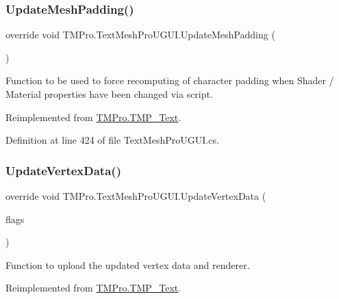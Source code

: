 \subsubsection{\texorpdfstring{UpdateMeshPadding()}{UpdateMeshPadding()}}
{\footnotesize\ttfamily override void T\+M\+Pro.\+Text\+Mesh\+Pro\+U\+G\+U\+I.\+Update\+Mesh\+Padding (\begin{DoxyParamCaption}{ }\end{DoxyParamCaption})\hspace{0.3cm}{\ttfamily [virtual]}}



Function to be used to force recomputing of character padding when Shader / Material properties have been changed via script. 



Reimplemented from \mbox{\hyperlink{class_t_m_pro_1_1_t_m_p___text_a874daa5045c407a26694d92f855c0761}{T\+M\+Pro.\+T\+M\+P\+\_\+\+Text}}.



Definition at line 424 of file Text\+Mesh\+Pro\+U\+G\+U\+I.\+cs.

\mbox{\label{class_t_m_pro_1_1_text_mesh_pro_u_g_u_i_a2fb671e18fda5d2e996ed13347fefffa}} 
\subsubsection{\texorpdfstring{UpdateVertexData()}{UpdateVertexData()}\hspace{0.1cm}{\footnotesize\ttfamily [1/2]}}
{\footnotesize\ttfamily override void T\+M\+Pro.\+Text\+Mesh\+Pro\+U\+G\+U\+I.\+Update\+Vertex\+Data (\begin{DoxyParamCaption}\item[{\mbox{\hyperlink{namespace_t_m_pro_a517464fab2ef7ff5b9658d2acaf49a57}{T\+M\+P\+\_\+\+Vertex\+Data\+Update\+Flags}}}]{flags }\end{DoxyParamCaption})\hspace{0.3cm}{\ttfamily [virtual]}}



Function to upload the updated vertex data and renderer. 



Reimplemented from \mbox{\hyperlink{class_t_m_pro_1_1_t_m_p___text_ae4079b9679758f2a086a0e9f63893475}{T\+M\+Pro.\+T\+M\+P\+\_\+\+Text}}.



